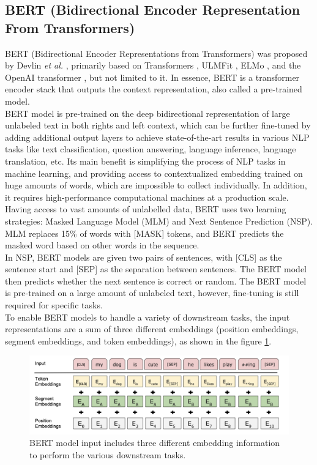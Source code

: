 \documentclass[%
	BCOR=8mm, %
	DIV=12,
	toc=bibliography, %
	toc=listof, %
	oneside, %
	egregdoesnotlikesansseriftitles, %
	]{scrbook}
\begin{document}
\subsection{BERT (Bidirectional Encoder Representation From Transformers)}
BERT (Bidirectional Encoder Representations from Transformers) was proposed by Devlin \textit{et al.} \cite{devlin_bert_2019-1}, primarily based on Transformers \cite{vaswani_attention_2017}, ULMFit \cite{howard_universal_2018}, ELMo \cite{peters_deep_2018-3}, and the OpenAI transformer \cite{radford_improving_nodate}, but not limited to it. In essence, BERT is a transformer encoder stack that outputs the context representation, also called a pre-trained model. \\
BERT model is pre-trained on the deep bidirectional representation of large unlabeled text in both rights and left context, which can be further fine-tuned by adding additional output layers to achieve state-of-the-art results in various NLP tasks like text classification, question answering, language inference, language translation, etc. Its main benefit is simplifying the process of NLP tasks in machine learning, and providing access to contextualized embedding trained on huge amounts of words, which are impossible to collect individually. In addition, it requires high-performance computational machines at a production scale. \\
Having access to vast amounts of unlabelled data,  BERT uses two learning strategies: Masked Language Model (MLM) and Next Sentence Prediction (NSP). MLM replaces 15\% of words with [MASK] tokens, and BERT predicts the masked word based on other words in the sequence.\\
In NSP, BERT models are given two pairs of sentences, with [CLS] as the sentence start and [SEP] as the separation between sentences. The BERT model then predicts whether the next sentence is correct or random. The BERT model is pre-trained on a large amount of unlabeled text, however, fine-tuning is still required for specific tasks.\\
To enable BERT models to handle a variety of downstream tasks, the input representations are a sum of three different embeddings (position embeddings, segment embeddings, and token embeddings), as shown in the figure \ref{fig:bert_inp}.
\begin{figure}[H]
    \centering
    \includegraphics[width=0.6\linewidth]{img/bert_inp.png}
    \caption[Three different embeddings in BERT model]{\small BERT model input includes three different embedding information to perform the various downstream tasks\cite{devlin_bert_2019-1}. }
    \label{fig:bert_inp}
\end{figure}
\end{document}
